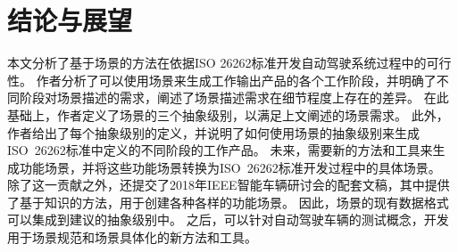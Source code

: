 \section{结论与展望}
\label{conclusion}
本文分析了基于场景的方法在依据ISO 26262标准开发自动驾驶系统过程中的可行性。
作者分析了可以使用场景来生成工作输出产品的各个工作阶段，并明确了不同阶段对场景描述的需求，阐述了场景描述需求在细节程度上存在的差异。
在此基础上，作者定义了场景的三个抽象级别，以满足上文阐述的场景需求。
此外，作者给出了每个抽象级别的定义，并说明了如何使用场景的抽象级别来生成ISO~26262标准中定义的不同阶段的工作产品。
未来，需要新的方法和工具来生成功能场景，并将这些功能场景转换为ISO~26262标准开发过程中的具体场景。
除了这一贡献之外，还提交了2018年IEEE智能车辆研讨会的配套文稿，其中提供了基于知识的方法，用于创建各种各样的功能场景。
因此，场景的现有数据格式可以集成到建议的抽象级别中。
之后，可以针对自动驾驶车辆的测试概念，开发用于场景规范和场景具体化的新方法和工具。